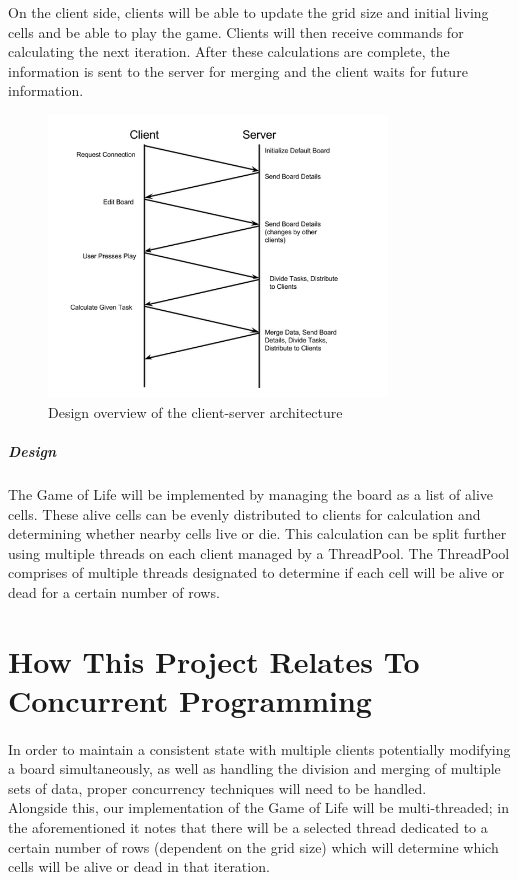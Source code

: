 \documentclass[12pt,a4paper]{report}
\begin{document}
On the client side, clients will be able to update the grid size and initial living cells and be able to play the game. Clients will then receive commands for calculating the next iteration. After these calculations are complete, the information is sent to the server for merging and the client waits for future information. 
\begin{figure}[ht!]
\centering
\includegraphics[width=90mm]{client_server_architecture.jpg}
\caption{Design overview of the client-server architecture}
\label{fig:csa}
\end{figure}

\subparagraph*{Design} 
The Game of Life will be implemented by managing the board as a list of alive cells. These alive cells can be evenly distributed to clients for calculation and determining whether nearby cells live or die. This calculation can be split further using multiple threads on each client managed by a ThreadPool. The ThreadPool comprises of multiple threads designated to determine if each cell will be alive or dead for a certain number of rows.
\section{How This Project Relates To Concurrent Programming}
\paragraph{}
In order to maintain a consistent state with multiple clients potentially modifying a board simultaneously, as well as handling the division and merging of multiple sets of data, proper concurrency techniques will need to be handled. \\

Alongside this, our implementation of the Game of Life will be multi-threaded; in the aforementioned it notes that there will be a selected thread dedicated to a certain number of rows (dependent on the grid size) which will determine which cells will be alive or dead in that iteration. \\
\end{document}
